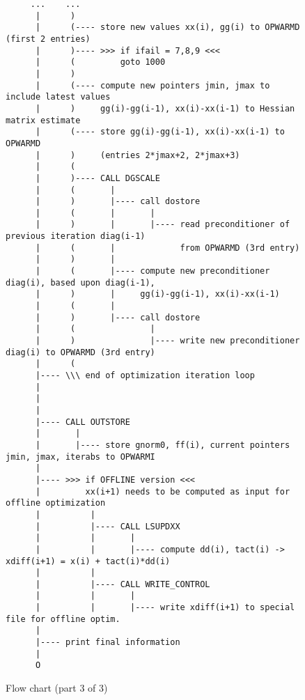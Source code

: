 \begin{figure}
%
{\scriptsize
\begin{verbatim}
     ...    ...
      |      )        
      |      (---- store new values xx(i), gg(i) to OPWARMD (first 2 entries)
      |      )---- >>> if ifail = 7,8,9 <<<
      |      (         goto 1000
      |      )
      |      (---- compute new pointers jmin, jmax to include latest values
      |      )     gg(i)-gg(i-1), xx(i)-xx(i-1) to Hessian matrix estimate
      |      (---- store gg(i)-gg(i-1), xx(i)-xx(i-1) to OPWARMD
      |      )     (entries 2*jmax+2, 2*jmax+3)
      |      (
      |      )---- CALL DGSCALE
      |      (       |
      |      )       |---- call dostore
      |      (       |       |
      |      )       |       |---- read preconditioner of previous iteration diag(i-1)
      |      (       |             from OPWARMD (3rd entry)
      |      )       |
      |      (       |---- compute new preconditioner diag(i), based upon diag(i-1),
      |      )       |     gg(i)-gg(i-1), xx(i)-xx(i-1)
      |      (       |
      |      )       |---- call dostore
      |      (               |
      |      )               |---- write new preconditioner diag(i) to OPWARMD (3rd entry)
      |      (
      |---- \\\ end of optimization iteration loop
      |
      |
      |
      |---- CALL OUTSTORE
      |       |
      |       |---- store gnorm0, ff(i), current pointers jmin, jmax, iterabs to OPWARMI
      |
      |---- >>> if OFFLINE version <<<
      |         xx(i+1) needs to be computed as input for offline optimization
      |          |
      |          |---- CALL LSUPDXX
      |          |       |
      |          |       |---- compute dd(i), tact(i) -> xdiff(i+1) = x(i) + tact(i)*dd(i)
      |          |
      |          |---- CALL WRITE_CONTROL
      |          |       |
      |          |       |---- write xdiff(i+1) to special file for offline optim.
      |
      |---- print final information
      |
      O
\end{verbatim}
}
\caption{Flow chart (part 3 of 3)}
\label{fig:lsoptflow3}
\end{figure}

